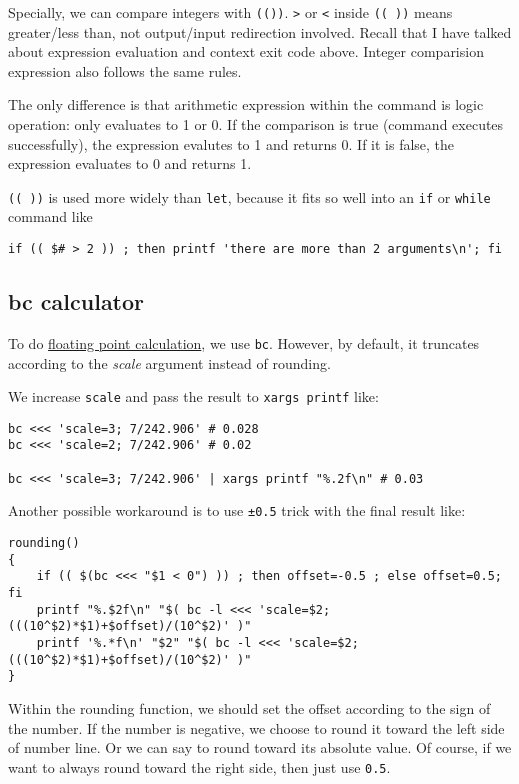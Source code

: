 Specially, we can compare integers with
\lstinline|(())|. \lstinline|>| or \lstinline|<| inside
\lstinline|(( ))| means greater/less than, not output/input
redirection involved. Recall that I have talked about expression
evaluation and context exit code above. Integer comparision
expression also follows the same rules.

The only difference is that arithmetic expression within the
command is logic operation: only evaluates to 1 or 0. If the
comparison is true (command executes successfully), the expression
evalutes to 1 and returns 0. If it is false, the expression
evaluates to 0 and returns 1.

\lstinline|(( ))| is used more widely than \lstinline|let|,
because it fits so well into an \lstinline|if| or
\lstinline|while| command like

\begin{lstlisting}
if (( $# > 2 )) ; then printf 'there are more than 2 arguments\n'; fi
\end{lstlisting}

\subsection{bc calculator}
\label{sec:bc-calculator}

To do \href{http://mywiki.wooledge.org/BashFAQ/022}{floating point
  calculation}, we use \lstinline|bc|. However, by default, it
truncates according to the \textit{scale} argument instead of
rounding.

We increase \lstinline|scale| and pass the result to
\lstinline|xargs printf| like:

\begin{lstlisting}
bc <<< 'scale=3; 7/242.906' # 0.028
bc <<< 'scale=2; 7/242.906' # 0.02

bc <<< 'scale=3; 7/242.906' | xargs printf "%.2f\n" # 0.03
\end{lstlisting}

Another possible workaround is to use \verb|±0.5| trick with the final
result like:

\begin{lstlisting}
rounding()
{
    if (( $(bc <<< "$1 < 0") )) ; then offset=-0.5 ; else offset=0.5; fi
    printf "%.$2f\n" "$( bc -l <<< 'scale=$2; (((10^$2)*$1)+$offset)/(10^$2)' )"
    printf '%.*f\n' "$2" "$( bc -l <<< 'scale=$2; (((10^$2)*$1)+$offset)/(10^$2)' )"
}
\end{lstlisting}

Within the rounding function, we should set the offset according
to the sign of the number. If the number is negative, we choose to
round it toward the left side of number line. Or we can say to
round toward its absolute value. Of course, if we want to always
round toward the right side, then just use \verb|0.5|.

